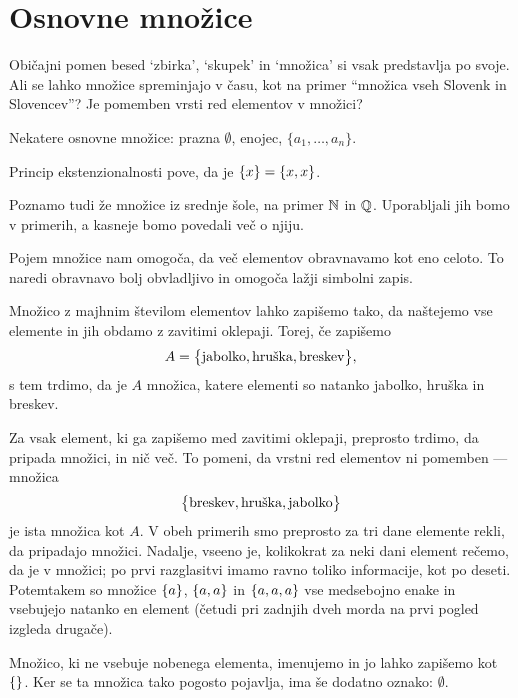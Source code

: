 \section{Osnovne množice}
\label{sec:osnovne-mnozice}

Običajni pomen besed `zbirka', `skupek' in `množica' si vsak predstavlja po svoje. Ali se
lahko množice spreminjajo v času, kot na primer ``množica vseh Slovenk in Slovencev''? Je
pomemben vrsti red elementov v množici?




Nekatere osnovne množice: prazna $\emptyset$, enojec, $\{a_1, \ldots, a_n\}$.

Princip ekstenzionalnosti pove, da je $\set{x} = \set{x, x}$.

Poznamo tudi že množice iz srednje šole, na primer $\mathbb{N}$ in $\mathbb{Q}$. Uporabljali jih bomo v
primerih, a kasneje bomo povedali več o njiju.

Pojem množice nam omogoča, da več elementov obravnavamo kot eno celoto. To naredi obravnavo bolj obvladljivo in omogoča lažji simbolni zapis.

Množico z majhnim številom elementov lahko zapišemo tako, da naštejemo vse elemente in jih obdamo z zavitimi oklepaji. Torej, če zapišemo
\[A = \set[1]{\text{jabolko}, \text{hruška}, \text{breskev}},\]
s tem trdimo, da je $A$ množica, katere elementi so natanko jabolko, hruška in breskev.

Za vsak element, ki ga zapišemo med zavitimi oklepaji, preprosto trdimo, da pripada množici, in nič več. To pomeni, da vrstni red elementov ni pomemben --- množica
\[\set[1]{\text{breskev}, \text{hruška}, \text{jabolko}}\]
je ista množica kot $A$. V obeh primerih smo preprosto za tri dane elemente rekli, da pripadajo množici. Nadalje, vseeno je, kolikokrat za neki dani element rečemo, da je v množici; po prvi razglasitvi imamo ravno toliko informacije, kot po deseti. Potemtakem so množice $\set{a}$, $\set{a, a}$ in $\set{a, a, a}$ vse medsebojno enake in vsebujejo natanko en element (četudi pri zadnjih dveh morda na prvi pogled izgleda drugače).

Množico, ki ne vsebuje nobenega elementa, imenujemo  in jo lahko zapišemo kot $\set{}$. Ker se ta množica tako pogosto pojavlja, ima še dodatno oznako: $\emptyset$.

